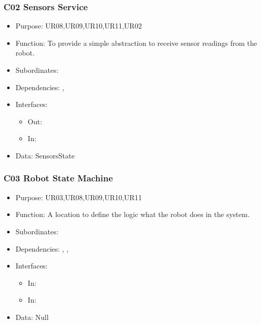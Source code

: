 \subsubsection{C02 Sensors Service} \label{compSense}
\begin{itemize}
	\item Purpose: UR08,UR09,UR10,UR11,UR02
	\item Function: To provide a simple abstraction to receive sensor readings from the robot. 
	\item Subordinates: 
	\item Dependencies: , 
	\item Interfaces:
	\begin{itemize}
		\item Out: \texttt{}
		\item In: \texttt{}
	\end{itemize}
	\item Data: SensorsState
\end{itemize}

\subsubsection{C03 Robot State Machine} \label{compState}
\begin{itemize}
	\item Purpose: UR03,UR08,UR09,UR10,UR11
	\item Function: A location to define the logic what the robot does in the system.
	\item Subordinates: 
	\item Dependencies: , , 
	\item Interfaces:
	\begin{itemize}
		\item In: \texttt{}
		\item In: \texttt{}
	\end{itemize}
	\item Data: Null
\end{itemize}

